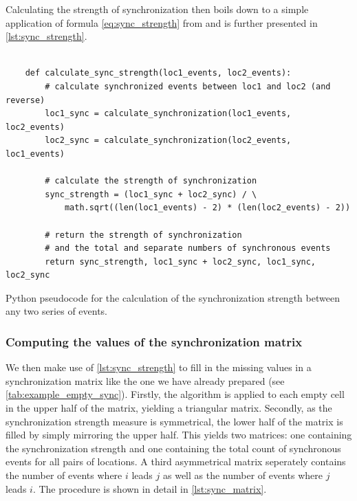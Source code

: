 Calculating the strength of synchronization then boils down to a simple application of formula \eqref{eq:sync_strength} from \pageref{eq:sync_strength} and is further presented in \cref{lst:sync_strength}.

\begin{listing}[H]
  \begin{verbatim}

    def calculate_sync_strength(loc1_events, loc2_events):
        # calculate synchronized events between loc1 and loc2 (and reverse)
        loc1_sync = calculate_synchronization(loc1_events, loc2_events)
        loc2_sync = calculate_synchronization(loc2_events, loc1_events)

        # calculate the strength of synchronization
        sync_strength = (loc1_sync + loc2_sync) / \
            math.sqrt((len(loc1_events) - 2) * (len(loc2_events) - 2))

        # return the strength of synchronization
        # and the total and separate numbers of synchronous events
        return sync_strength, loc1_sync + loc2_sync, loc1_sync, loc2_sync

  \end{verbatim}
  \caption{Python pseudocode for the calculation of the synchronization strength between any two series of events.}
  \label{lst:sync_strength}
\end{listing}

\subsubsection{Computing the values of the synchronization matrix}
We then make use of \cref{lst:sync_strength} to fill in the missing values in a synchronization matrix like the one we have already prepared (see \cref{tab:example_empty_sync}). Firstly, the algorithm is applied to each empty cell in the upper half of the matrix, yielding a triangular matrix. Secondly, as the synchronization strength measure is symmetrical, the lower half of the matrix is filled by simply mirroring the upper half. This yields two matrices: one containing the synchronization strength and one containing the total count of synchronous events for all pairs of locations. A third asymmetrical matrix seperately contains the number of events where $i$ leads $j$ as well as the number of events where $j$ leads $i$. The procedure is shown in detail in \cref{lst:sync_matrix}.

